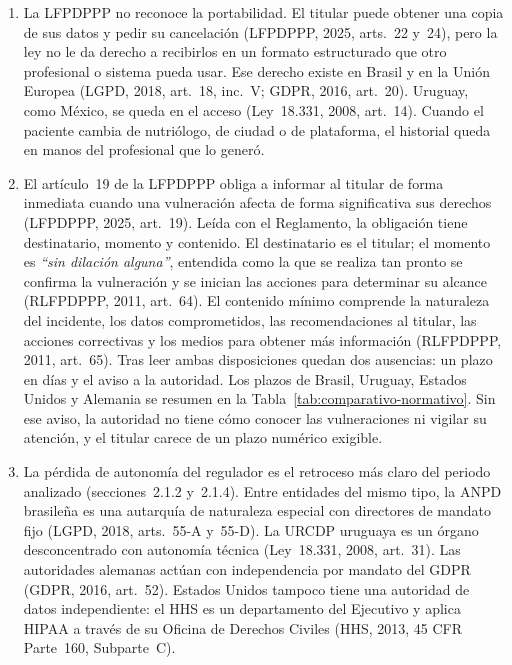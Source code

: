 \documentclass[12pt, a4paper]{article}
\begin{document}
\begin{enumerate}[label=\Roman*.]
 
  \item La LFPDPPP no reconoce la portabilidad. El titular puede
  obtener una copia de sus datos y pedir su cancelación (LFPDPPP,
  2025, arts.~22 y~24), pero la ley no le da derecho a recibirlos en
  un formato estructurado que otro profesional o sistema pueda usar.
  Ese derecho existe en Brasil y en la Unión Europea (LGPD, 2018,
  art.~18, inc.~V; GDPR, 2016, art.~20). Uruguay, como México, se
  queda en el acceso (Ley~18.331, 2008, art.~14).
  Cuando el paciente cambia de nutriólogo, de ciudad o de
  plataforma, el historial queda en manos del profesional que lo
  generó.
 
  \item El artículo~19 de la LFPDPPP obliga a informar al titular de
  forma inmediata cuando una vulneración afecta de forma significativa
  sus derechos (LFPDPPP, 2025, art.~19). Leída con el Reglamento, la
  obligación tiene destinatario, momento y contenido. El
  destinatario es el titular; el momento es \textit{``sin dilación
  alguna''}, entendida como la que se realiza tan pronto se confirma
  la vulneración y se inician las acciones para determinar su alcance
  (RLFPDPPP, 2011, art.~64). El contenido mínimo comprende la
  naturaleza del incidente, los datos comprometidos, las
  recomendaciones al titular, las acciones correctivas y los medios
  para obtener más información (RLFPDPPP, 2011, art.~65). Tras leer
  ambas disposiciones quedan dos ausencias: un plazo en días y el
  aviso a la autoridad. Los plazos de Brasil, Uruguay, Estados
  Unidos y Alemania se resumen en la
  Tabla~\ref{tab:comparativo-normativo}. Sin ese aviso, la
  autoridad no tiene cómo conocer las vulneraciones ni vigilar su
  atención, y el titular carece de un plazo numérico exigible.
 
  \item La pérdida de autonomía del regulador es el retroceso más
  claro del periodo analizado (secciones~2.1.2 y~2.1.4). Entre entidades del mismo
  tipo, la ANPD brasileña es una autarquía de naturaleza especial con
  directores de mandato fijo (LGPD, 2018, arts.~55-A y~55-D). La URCDP
  uruguaya es un órgano desconcentrado con autonomía técnica (Ley~18.331,
  2008, art.~31). Las autoridades alemanas actúan con independencia por
  mandato del GDPR (GDPR, 2016, art.~52). Estados Unidos tampoco tiene una
  autoridad de
  datos independiente: el HHS es un departamento del Ejecutivo y
  aplica HIPAA a través de su Oficina de Derechos Civiles (HHS,
  2013, 45 CFR Parte~160, Subparte~C).
 

\end{enumerate}
\end{document}
